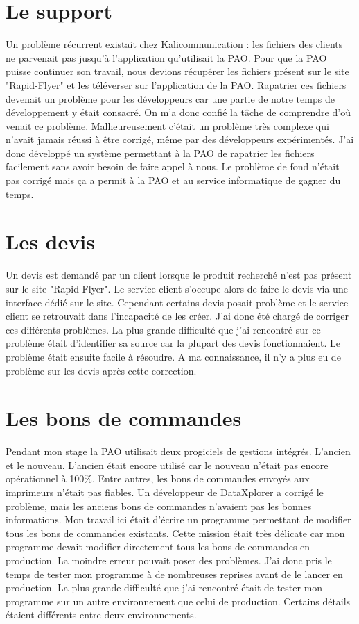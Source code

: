 
\section{Le support}
Un problème récurrent existait chez Kalicommunication : les fichiers des clients ne parvenait pas jusqu'à l'application qu'utilisait la PAO. Pour que la PAO puisse continuer son travail, nous devions récupérer les fichiers présent sur le site "Rapid-Flyer" et les téléverser sur l'application de la PAO.\newline
Rapatrier ces fichiers devenait un problème pour les développeurs car une partie de notre temps de développement y était consacré.\newline
On m'a donc confié la tâche de comprendre d'où venait ce problème. Malheureusement c'était un problème très complexe qui n'avait jamais réussi à être corrigé, même par des développeurs expérimentés. J'ai donc développé un système permettant à la PAO de rapatrier les fichiers facilement sans avoir besoin de faire appel à nous. Le problème de fond n'était pas corrigé mais ça a permit à la PAO et au service informatique de gagner du temps.

\section{Les devis}
Un devis est demandé par un client lorsque le produit recherché n'est pas présent sur le site "Rapid-Flyer". Le service client s'occupe alors de faire le devis via une interface dédié sur le site. Cependant certains devis posait problème et le service client se retrouvait dans l'incapacité de les créer.\newline
J'ai donc été chargé de corriger ces différents problèmes. La plus grande difficulté que j'ai rencontré sur ce problème était d'identifier sa source car la plupart des devis fonctionnaient. Le problème était ensuite facile à résoudre. A ma connaissance, il n'y a plus eu de problème sur les devis après cette correction.

\section{Les bons de commandes}
Pendant mon stage la PAO utilisait deux progiciels de gestions intégrés. L'ancien et le nouveau. L'ancien était encore utilisé car le nouveau n'était pas encore opérationnel à 100\%. Entre autres, les bons de commandes envoyés aux imprimeurs n'était pas fiables. Un développeur de DataXplorer a corrigé le problème, mais les anciens bons de commandes n'avaient pas les bonnes informations. Mon travail ici était d'écrire un programme permettant de modifier tous les bons de commandes existants. Cette mission était très délicate car mon programme devait modifier directement tous les bons de commandes en production. La moindre erreur pouvait poser des problèmes. J'ai donc pris le temps de tester mon programme à de nombreuses reprises avant de le lancer en production. La plus grande difficulté que j'ai rencontré était de tester mon programme sur un autre environnement que celui de production. Certains détails étaient différents entre deux environnements.
